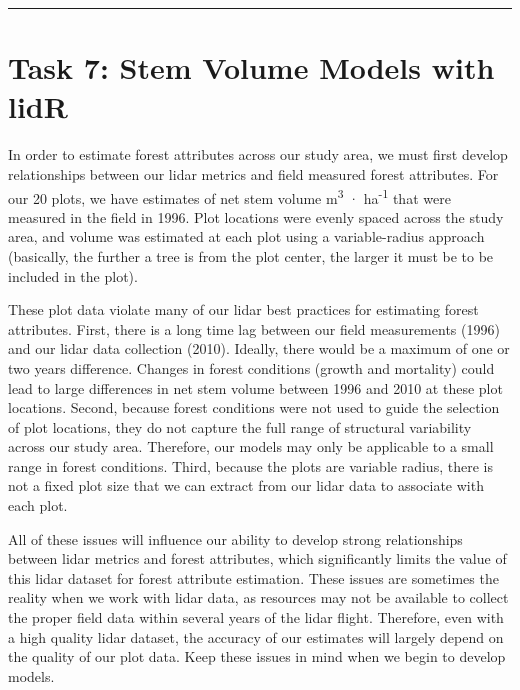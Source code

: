 \documentclass[
]{book}
\begin{document}
\begin{center}\rule{0.5\linewidth}{0.5pt}\end{center}

\hypertarget{task-7-stem-volume-models-with-lidr}{%
\section*{Task 7: Stem Volume Models with lidR}\label{task-7-stem-volume-models-with-lidr}}

In order to estimate forest attributes across our study area, we must first develop relationships between our lidar metrics and field measured forest attributes. For our 20 plots, we have estimates of net stem volume m\textsuperscript{3} · ha\textsuperscript{-1} that were measured in the field in 1996. Plot locations were evenly spaced across the study area, and volume was estimated at each plot using a variable-radius approach (basically, the further a tree is from the plot center, the larger it must be to be included in the plot).

These plot data violate many of our lidar best practices for estimating forest attributes. First, there is a long time lag between our field measurements (1996) and our lidar data collection (2010). Ideally, there would be a maximum of one or two years difference. Changes in forest conditions (growth and mortality) could lead to large differences in net stem volume between 1996 and 2010 at these plot locations. Second, because forest conditions were not used to guide the selection of plot locations, they do not capture the full range of structural variability across our study area. Therefore, our models may only be applicable to a small range in forest conditions. Third, because the plots are variable radius, there is not a fixed plot size that we can extract from our lidar data to associate with each plot.

All of these issues will influence our ability to develop strong relationships between lidar metrics and forest attributes, which significantly limits the value of this lidar dataset for forest attribute estimation. These issues are sometimes the reality when we work with lidar data, as resources may not be available to collect the proper field data within several years of the lidar flight. Therefore, even with a high quality lidar dataset, the accuracy of our estimates will largely depend on the quality of our plot data. Keep these issues in mind when we begin to develop models.
\end{document}

